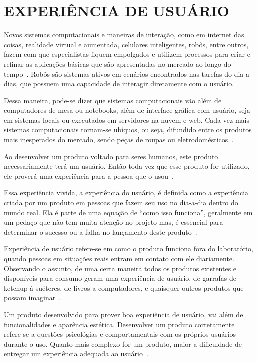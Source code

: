 \chapter{EXPERIÊNCIA DE USUÁRIO}
\label{cap:ux}
Novos sistemas computacionais e maneiras de interação, como em internet das coisas, realidade virtual e aumentada, celulares inteligentes, robôs, entre outros, fazem com que especialistas fiquem empolgados e utilizem processos para criar e refinar as aplicações básicas que são apresentadas no mercado ao longo do tempo~\cite{hartson:2012}. Robôs são sistemas ativos em cenários encontrados nas tarefas do dia-a-dias, que possuem uma capacidade de interagir diretamente com o usuário.

Dessa maneira, pode-se dizer que sistemas computacionais vão além de computadores de mesa ou notebooks, além de interface gráfica com usuário, seja em sistemas locais ou executados em servidores na nuvem e web. Cada vez mais sistemas computacionais tornam-se ubíquos, ou seja, difundido entre os produtos mais inesperados do mercado, sendo peças de roupas ou eletrodomésticos~\cite{hartson:2012}.

Ao desenvolver um produto voltado para seres humanos, este produto necessariamente terá um usuário. Então toda vez que esse produto for utilizado, ele proverá uma experiência para a pessoa que o usou~\cite{garrett:2010}.

Essa experiência vivida, a experiência do usuário, é definida como a experiência criada por um produto em pessoas que fazem seu uso no dia-a-dia dentro do mundo real. Ela é parte de uma equação de ``como isso funciona'', geralmente em um pedaço que não tem muita atenção no projeto mas, é essencial para determinar o sucesso ou a falha no lançamento deste produto~\cite{garrett:2010}.

Experiência de usuário refere-se em como o produto funciona fora do laboratório, quando pessoas em situações reais entram em contato com ele diariamente. Observando o assunto, de uma certa maneira todos os produtos existentes e disponíveis para consumo geram uma experiência de usuário, de garrafas de ketchup à suéteres, de livros a computadores, e quaisquer outros produtos que possam imaginar~\cite{garrett:2010}.

Um produto desenvolvido para prover boa experiência de usuário, vai além de funcionalidades e aparência estética. Desenvolver um produto corretamente refere-se a questões psicológias e comportamentais com os próprios usuários durante o uso. Quanto mais complexo for um produto, maior a dificuldade de entregar um experiência adequada ao usuário~\cite{garrett:2010}.

